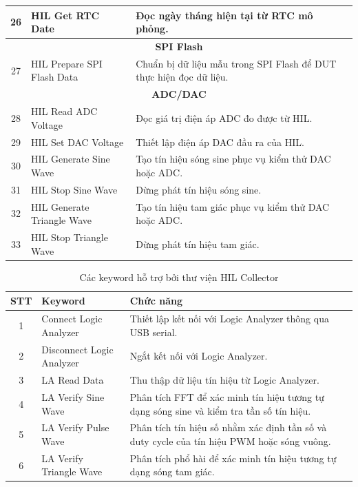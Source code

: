 \begin{longtable}{|c|p{4.8cm}|p{7.8cm}|}
26 & HIL Get RTC Date
& Đọc ngày tháng hiện tại từ RTC mô phỏng. \\
\hline

\multicolumn{3}{|c|}{\textbf{SPI Flash}} \\
\hline

27 & HIL Prepare SPI Flash Data
& Chuẩn bị dữ liệu mẫu trong SPI Flash để DUT thực hiện đọc dữ liệu. \\
\hline

\multicolumn{3}{|c|}{\textbf{ADC/DAC}} \\
\hline

28 & HIL Read ADC Voltage
& Đọc giá trị điện áp ADC đo được từ HIL. \\
\hline

29 & HIL Set DAC Voltage
& Thiết lập điện áp DAC đầu ra của HIL. \\
\hline

30 & HIL Generate Sine Wave
& Tạo tín hiệu sóng sine phục vụ kiểm thử DAC hoặc ADC. \\
\hline

31 & HIL Stop Sine Wave
& Dừng phát tín hiệu sóng sine. \\
\hline

32 & HIL Generate Triangle Wave
& Tạo tín hiệu tam giác phục vụ kiểm thử DAC hoặc ADC. \\
\hline

33 & HIL Stop Triangle Wave
& Dừng phát tín hiệu tam giác. \\
\hline

\end{longtable}

\begin{table}[H]
\centering
\caption{Các keyword hỗ trợ bởi thư viện HIL Collector}
\label{tab:la_keywords}

\begin{tabular}{|c|p{5cm}|p{7.5cm}|}
\hline
\textbf{STT} & \textbf{Keyword} & \textbf{Chức năng} \\
\hline

1
& Connect Logic Analyzer
& Thiết lập kết nối với Logic Analyzer thông qua USB serial. \\
\hline

2
& Disconnect Logic Analyzer
& Ngắt kết nối với Logic Analyzer. \\
\hline

3
& LA Read Data
& Thu thập dữ liệu tín hiệu từ Logic Analyzer. \\
\hline

4
& LA Verify Sine Wave
& Phân tích FFT để xác minh tín hiệu tương tự dạng sóng sine và kiểm tra tần số tín hiệu. \\
\hline

5
& LA Verify Pulse Wave
& Phân tích tín hiệu số nhằm xác định tần số và duty cycle của tín hiệu PWM hoặc sóng vuông. \\
\hline

6
& LA Verify Triangle Wave
& Phân tích phổ hài để xác minh tín hiệu tương tự dạng sóng tam giác. \\
\hline

\end{tabular}
\end{table}

